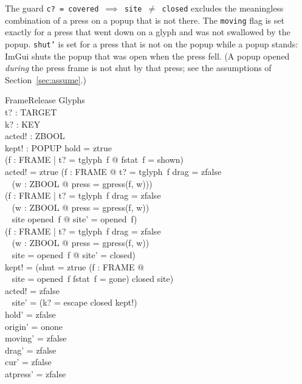 \documentclass[a4paper,10pt,fleqn]{article}
\begin{document}
The guard \texttt{c?~=~covered~$\implies$~site~$\neq$~closed} excludes the
meaningless combination of a press on a popup that is not there.  The
\texttt{moving} flag is set exactly for a press that went down on a glyph and
was not swallowed by the popup.  \texttt{shut'} is set for a press that is not
on the popup while a popup stands: ImGui shuts the popup that was open when the
press fell.  (A popup opened \emph{during} the press frame is not shut by that
press; see the assumptions of Section~\ref{sec:assume}.)

\begin{schema}{FrameRelease}
  \Delta Glyphs \\
  t? : TARGET \\
  k? : KEY \\
  acted! : ZBOOL \\
  kept! : POPUP
\where
  hold = ztrue \\
  (\forall f : FRAME | t? = tglyph~f @ fstat~f = shown) \\
  acted! = ztrue \iff (\exists f : FRAME @ t? = tglyph~f \land drag = zfalse \\
  \quad~ \land (\exists w : ZBOOL @ press = gpress(f, w))) \\
  (\forall f : FRAME | t? = tglyph~f \land drag = zfalse \\
  \quad~ \land (\exists w : ZBOOL @ press = gpress(f, w)) \\
  \quad~ \land site \neq opened~f @ site' = opened~f) \\
  (\forall f : FRAME | t? = tglyph~f \land drag = zfalse \\
  \quad~ \land (\exists w : ZBOOL @ press = gpress(f, w)) \\
  \quad~ \land site = opened~f @ site' = closed) \\
  kept! = (\IF shut = ztrue \lor (\exists f : FRAME @ \\
  \quad~ site = opened~f \land fstat~f = gone) \THEN closed \ELSE site) \\
  acted! = zfalse \implies \\
  \quad~ site' = (\IF k? = escape \THEN closed \ELSE kept!) \\
  hold' = zfalse \\
  origin' = onone \\
  moving' = zfalse \\
  drag' = zfalse \\
  cur' = zfalse \\
  atpress' = zfalse \\

\end{schema}
\end{document}
